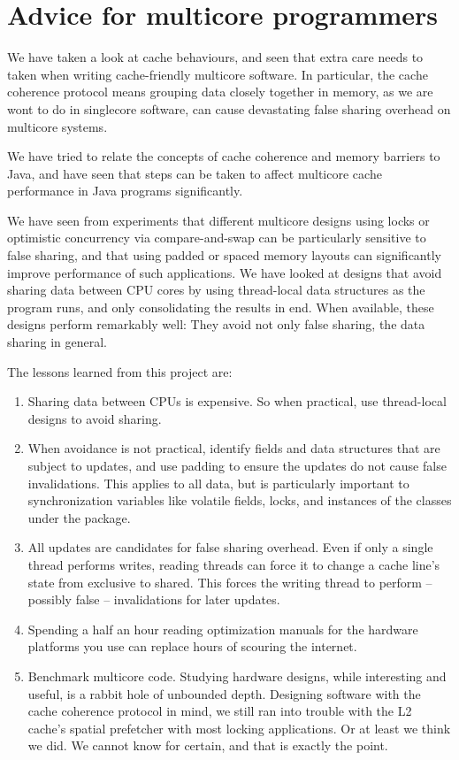 \chapter{Advice for multicore programmers}
\label{chap:advice}
We have taken a look at cache behaviours, and seen that extra care needs to
taken when writing cache-friendly multicore software.
In particular, the cache coherence protocol means grouping data closely
together in memory, as we are wont to do in singlecore software, can cause
devastating false sharing overhead on multicore systems.

We have tried to relate the concepts of cache coherence and
memory barriers to Java, and have seen that steps can be taken to affect
multicore cache performance in Java programs significantly.

We have seen from experiments that different multicore designs using locks or
optimistic concurrency via compare-and-swap can be particularly sensitive to
false sharing, and that using padded or spaced memory layouts can significantly
improve performance of such applications. We have looked at designs that avoid
sharing data between CPU cores by using thread-local data structures as the
program runs, and only consolidating the results in end. When available, these
designs perform remarkably well: They avoid not only false sharing, the data
sharing in general.

The lessons learned from this project are:
\begin{enumerate}
\item Sharing data between CPUs is expensive. So when practical, use
thread-local designs to avoid sharing.
\item When avoidance is not practical, identify fields and data structures that
are subject to updates, and use padding to ensure the updates do not cause false
invalidations. This applies to all data, but is particularly important to synchronization variables like
volatile fields, locks, and instances of the classes under the
 package.
\item All updates are candidates for false sharing overhead. Even if only a
single thread performs writes, reading threads can force it to change a cache
line's state from exclusive to shared. This forces the writing thread to perform --
possibly false -- invalidations for later updates.
\item Spending a half an hour reading optimization manuals for the hardware
platforms you use can replace hours of scouring the internet.
\item Benchmark multicore code. Studying hardware designs, while interesting
and useful, is a rabbit hole of unbounded depth. Designing software with the
cache coherence protocol in mind, we still ran into trouble with the L2 cache's
spatial prefetcher with most locking applications. Or at least we think we did.
We cannot know for certain, and that is exactly the point.
\end{enumerate}
